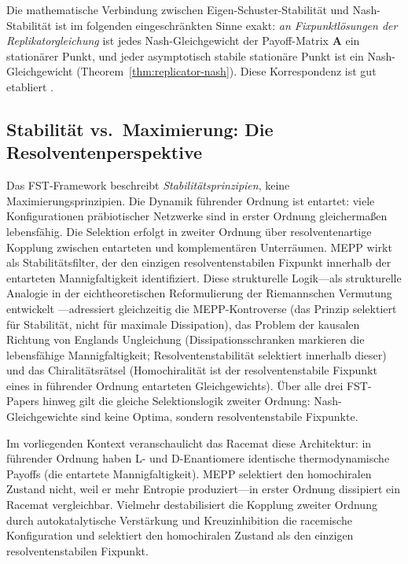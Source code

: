 \documentclass[12pt,a4paper]{article}
\theoremstyle{remark}
\begin{document}
Die mathematische Verbindung zwischen Eigen-Schuster-Stabilit\"at und Nash-Stabilit\"at ist im folgenden eingeschr\"ankten Sinne exakt: \emph{an Fixpunktl\"osungen der Replikatorgleichung} ist jedes Nash-Gleichgewicht der Payoff-Matrix $\mathbf{A}$ ein station\"arer Punkt, und jeder asymptotisch stabile station\"are Punkt ist ein Nash-Gleichgewicht (Theorem~\ref{thm:replicator-nash}). Diese Korrespondenz ist gut etabliert \citep{HofbauerSigmund2003}.

\subsection{Stabilit\"at vs.\ Maximierung: Die Resolventenperspektive}

Das FST-Framework beschreibt \emph{Stabilit\"atsprinzipien}, keine Maximierungsprinzipien. Die Dynamik f\"uhrender Ordnung ist entartet: viele Konfigurationen pr\"abiotischer Netzwerke sind in erster Ordnung gleicherma\ss{}en lebensfähig. Die Selektion erfolgt in zweiter Ordnung \"uber resolventenartige Kopplung zwischen entarteten und komplement\"aren Unterr\"aumen. MEPP wirkt als Stabilit\"atsfilter, der den einzigen resolventenstabilen Fixpunkt innerhalb der entarteten Mannigfaltigkeit identifiziert. Diese strukturelle Logik---als strukturelle Analogie in der eichtheoretischen Reformulierung der Riemannschen Vermutung entwickelt \citep{GeigerRH2026b}---adressiert gleichzeitig die MEPP-Kontroverse (das Prinzip selektiert f\"ur Stabilit\"at, nicht f\"ur maximale Dissipation), das Problem der kausalen Richtung von Englands Ungleichung (Dissipationsschranken markieren die lebensfähige Mannigfaltigkeit; Resolventenstabilit\"at selektiert innerhalb dieser) und das Chiralit\"atsr\"atsel (Homochiralit\"at ist der resolventenstabile Fixpunkt eines in f\"uhrender Ordnung entarteten Gleichgewichts). \"Uber alle drei FST-Papers hinweg gilt die gleiche Selektionslogik zweiter Ordnung: Nash-Gleichgewichte sind keine Optima, sondern resolventenstabile Fixpunkte.

Im vorliegenden Kontext veranschaulicht das Racemat diese Architektur: in f\"uhrender Ordnung haben L- und D-Enantiomere identische thermodynamische Payoffs (die entartete Mannigfaltigkeit). MEPP selektiert den homochiralen Zustand nicht, weil er mehr Entropie produziert---in erster Ordnung dissipiert ein Racemat vergleichbar. Vielmehr destabilisiert die Kopplung zweiter Ordnung durch autokatalytische Verst\"arkung und Kreuzinhibition die racemische Konfiguration und selektiert den homochiralen Zustand als den einzigen resolventenstabilen Fixpunkt.
\end{document}
